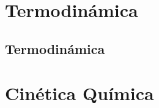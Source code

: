 \documentclass[
    11pt, %
    a4paper, %
]{

}
\begin{document}
    




    \part{Termodinámica}


    \chapterspaceabove{6.75cm} %
    \chapterspacebelow{7.25cm} %



    \chapter{Termodinámica}

    

    \newpage

    



    \part{Cinética Química}


    \chapterspaceabove{6.75cm} %
    \chapterspacebelow{7.25cm} %
\end{document}

